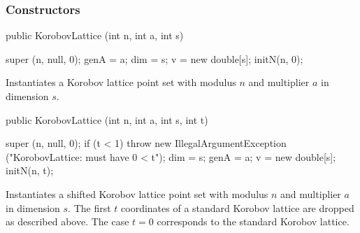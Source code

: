 \subsubsection*{Constructors}
\begin{code}
   public KorobovLattice (int n, int a, int s) \begin{hide} {
      super (n, null, 0);
      genA = a;
      dim = s;
      v = new double[s];
      initN(n, 0);
   }\end{hide}
\end{code}
 \begin{tabb}
   Instantiates a Korobov lattice point set with modulus $n$ and
   multiplier $a$ in dimension $s$.
 \end{tabb}
\begin{code}

   public KorobovLattice (int n, int a, int s, int t) \begin{hide} {
      super (n, null, 0);
      if (t < 1)
         throw new IllegalArgumentException
            ("KorobovLattice: must have 0 < t");
      dim = s;
      genA = a;
      v = new double[s];
      initN(n, t);
   }\end{hide}
\end{code}
 \begin{tabb}
   Instantiates a shifted Korobov lattice point set with modulus $n$ and
   multiplier $a$ in dimension $s$. The first $t$ coordinates of a
   standard Korobov lattice are dropped as described above.
   The case $t=0$ corresponds to the standard  Korobov lattice.
 \end{tabb}

